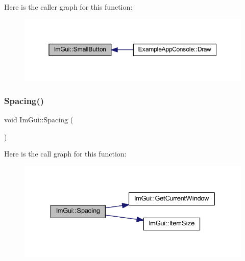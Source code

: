 Here is the caller graph for this function\+:
\nopagebreak
\begin{figure}[H]
\begin{center}
\leavevmode
\includegraphics[width=350pt]{namespace_im_gui_a5b76ec69758aeb0a00a66f142f7a4fb2_icgraph}
\end{center}
\end{figure}
\mbox{\label{namespace_im_gui_a2659e2bfe84b4cad0facd65d5c1ac90d}} 
\subsubsection{\texorpdfstring{Spacing()}{Spacing()}}
{\footnotesize\ttfamily void Im\+Gui\+::\+Spacing (\begin{DoxyParamCaption}{ }\end{DoxyParamCaption})}

Here is the call graph for this function\+:
\nopagebreak
\begin{figure}[H]
\begin{center}
\leavevmode
\includegraphics[width=329pt]{namespace_im_gui_a2659e2bfe84b4cad0facd65d5c1ac90d_cgraph}
\end{center}
\end{figure}
\mbox{\label{namespace_im_gui_a9d222e1384c6c56ff61b61cfa3016855}} 
